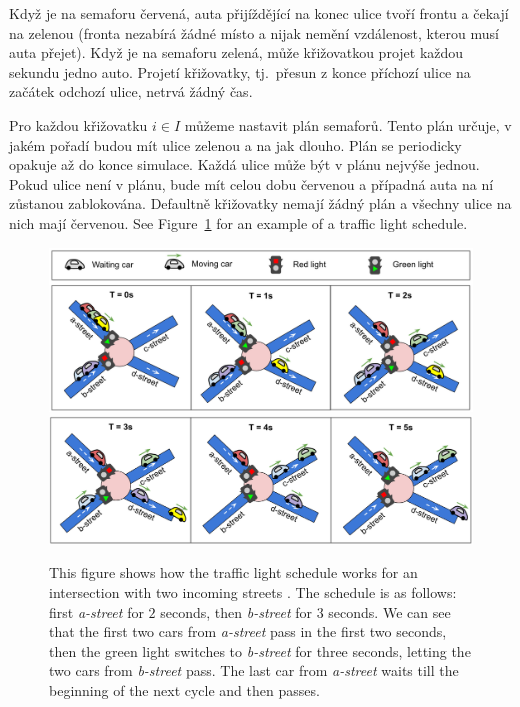Když je na semaforu červená, auta přijíždějící na konec ulice tvoří frontu a čekají na zelenou (fronta nezabírá žádné místo a nijak nemění vzdálenost, kterou musí auta přejet). Když je na semaforu zelená, může křižovatkou projet každou sekundu jedno auto. Projetí křižovatky, tj.\ přesun z konce příchozí ulice na začátek odchozí ulice, netrvá žádný čas.

Pro každou křižovatku $i \in I$ můžeme nastavit plán semaforů. Tento plán určuje, v jakém pořadí budou mít ulice zelenou a na jak dlouho. Plán se periodicky opakuje až do konce simulace. Každá ulice může být v plánu nejvýše jednou. Pokud ulice není v plánu, bude mít celou dobu červenou a případná auta na ní zůstanou zablokována. Defaultně křižovatky nemají žádný plán a všechny ulice na nich mají červenou. See Figure~\ref{fig:hashcode_traffic_lights} for an example of a traffic light schedule.

\begin{figure}[ht] %
    \centering
    \includegraphics[width=\linewidth]{img/hashcode/figure2-abc.png}
    \includegraphics[width=\linewidth]{img/hashcode/figure2-def.png}
    \caption[Example of a traffic light schedule]{
        This figure shows how the traffic light schedule works for an intersection with two incoming streets \cite{google_coding_competitions}.
        The schedule is as follows: first \textit{a-street} for $2$ seconds, then \textit{b-street} for $3$ seconds.
        We can see that the first two cars from \textit{a-street} pass in the first two seconds, then the green light switches to \textit{b-street} for three seconds,
        letting the two cars from \textit{b-street} pass. The last car from \textit{a-street} waits till the beginning of the next cycle and then passes.
    }
    \label{fig:hashcode_traffic_lights}
\end{figure}

